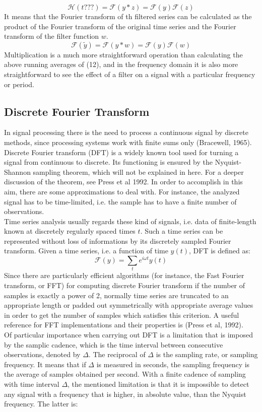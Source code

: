 \documentclass{article}
\begin{document}
\begin{equation}
\mathcal{H}(t???)=\mathcal{F}(y\ast z)=\mathcal{F}(y)\mathcal{F}(z)
\end{equation}
It means that the Fourier transform of th filtered series can be calculated as the product of the Fourier transform of the original time series and the Fourier transform of the filter function $w$.
\begin{equation}
\mathcal{F}(\tilde{y})=\mathcal{F}(y\ast w)=\mathcal{F}(y)\mathcal{F}(w)
\end{equation}
Multiplication is a much more straightforward operation than calculating the above running averages of (12), and in the frequency domain it is also more straightforward to see the effect of a filter on a signal with a particular frequency or period.
\subsection{Discrete Fourier Transform}
In signal processing there is the need to process a continuous signal by discrete methods, since processing systems work with finite sums only (Bracewell, 1965). Discrete Fourier transform (DFT) is a widely known tool used for turning a signal from continuous to discrete. Its functioning is ensured by the Nyquist-Shannon sampling theorem, which will not be explained in here. For a deeper discussion of the theorem, see Press et al 1992.  In order to accomplish in this aim, there are some approximations to deal with. For instance, the analyzed signal has to be time-limited, i.e. the sample has to have a finite number of observations. \\ Time series analysis usually regards these kind of signals, i.e. data of finite-length known at discretely regularly spaced times $t$. Such a time series can be represented without loss of informations by its discretely sampled Fourier transform. Given a time series, i.e. a function of time $y(t)$, DFT is defined as:
\begin{equation}
\mathcal{F}(y)=\sum_{t}e^{i\omega t}y(t)
\end{equation}
Since there are particularly efficient algorithms (for instance, the Fast Fourier transform, or FFT) for computing discrete Fourier transform if the number of samples is exactly a power of 2, normally time series are truncated to an appropriate length or padded out symmetrically with appropriate average values in order to get the number of samples which satisfies this criterion. A useful reference for FFT implementations and their properties is (Press et al, 1992).\\Of particular importance when carrying out DFT is a limitation that is imposed by the samplic cadence, which is the time interval between consecutive observations, denoted by $\Delta$. The reciprocal of $\Delta$ is the sampling rate, or sampling frequency. It means that if $\Delta$ is measured in seconds, the sampling frequency is the average of samples obtained per second. With a finite cadence of sampling with time interval $\Delta$, the mentioned limitation is that it is impossible to detect any signal with a frequency that is higher, in absolute value, than the Nyquist frequency. The latter is:
\end{document}
